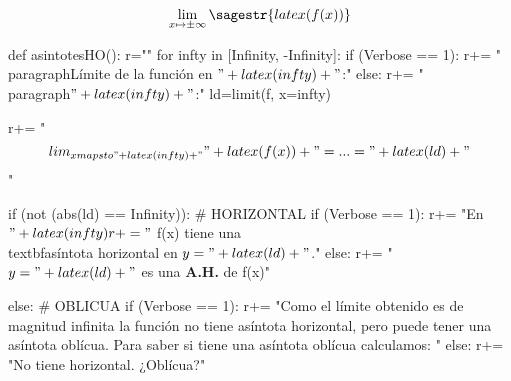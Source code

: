 \[\lim_{x\mapsto \pm\infty} \sagestr{latex(f(x))} \]

\begin{sagesilent}
def asintotesHO():
    r=""
    for infty in [Infinity, -Infinity]:
        if (Verbose == 1):
            r+= "\\paragraph{Límite de la función en $"+latex(infty)+"$:}"
        else:
            r+= "\\paragraph{$"+latex(infty)+"$:}"
        ld=limit(f, x=infty)  

        r+= "\[\\lim_{x\\mapsto "+latex(infty)+"}" + latex(f(x)) + "= ... = "+latex(ld)+"\]"    

        if (not (abs(ld) == Infinity)): # HORIZONTAL
            if (Verbose == 1):
                r+= "En $"+latex(infty)
                r+= "$ f(x) tiene una \\textbf{asíntota horizontal} en $y = "+latex(ld)+"$."
            else:
                r+= "$y = "+latex(ld) +" $ es una \textbf{A.H.} de f(x)"

        else: # OBLICUA
            if (Verbose == 1):
                r+= "Como el límite obtenido es de magnitud infinita la función no tiene asíntota horizontal, pero puede tener una asíntota oblícua. Para saber si tiene una asíntota oblícua calculamos: "
            else:
                r+= "No tiene horizontal. ¿Oblícua?"


\end{sagesilent}
